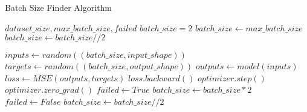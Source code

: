 \begin{algorithm}

    \caption{Batch Size Finder Algorithm}
    \begin{algorithmic} 
        \REQUIRE $dataset\_size, max\_batch\_size, failed$
        \STATE $batch\_size = 2$
                \STATE $batch\_size \leftarrow max\_batch\_size$
            \ENDIF
                \STATE $batch\_size \leftarrow batch\_size // 2$
            \ENDIF

                \LOOP
                    \STATE $inputs \leftarrow random((batch\_size,input\_shape))$
                    \STATE $targets \leftarrow random((batch\_size,output\_shape))$
                    \STATE $outputs \leftarrow model(inputs)$
                    \STATE $loss \leftarrow MSE(outputs, targets)$
                    \STATE $loss.backward()$
                    \STATE $optimizer.step()$
                    \STATE $optimizer.zero\_grad()$
                    \STATE $failed \leftarrow True$
                    \STATE $batch\_size \leftarrow batch\_size * 2$
                \ENDLOOP
                \STATE $failed \leftarrow False$
                \STATE $batch\_size \leftarrow batch\_size // 2$
            \ENDIF

        \ENDWHILE

    \end{algorithmic}
\end{algorithm}


